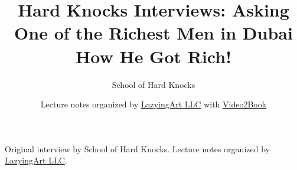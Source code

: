\documentclass[11pt,oneside]{book}
\begin{document}
\frontmatter
\title{Hard Knocks Interviews: Asking One of the Richest Men in Dubai How He Got Rich!}
\author{School of Hard Knocks}
\date{Lecture notes organized by \href{https://lazying.art}{LazyingArt LLC} with \href{https://github.com/lachlanchen/Video2Book}{Video2Book}}
\maketitle
\begin{center}
\small Original interview by School of Hard Knocks. Lecture notes organized by \href{https://lazying.art}{LazyingArt LLC}.
\end{center}
\clearpage
\mainmatter

\end{document}
